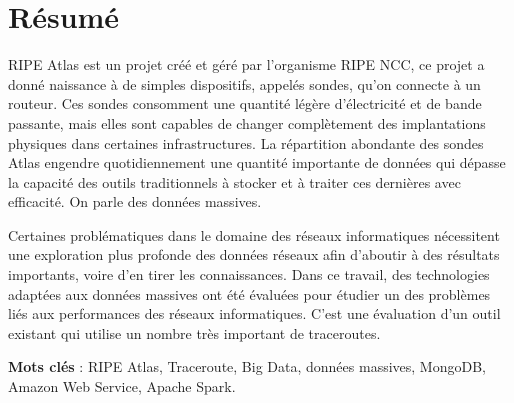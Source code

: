 \chapter*{Résumé}


RIPE Atlas est un projet créé et géré par l'organisme RIPE NCC,  ce projet a donné naissance à de
simples dispositifs, appelés sondes, qu'on  connecte à un routeur. Ces sondes consomment une quantité
légère d'électricité et de bande passante, mais elles sont capables de changer complètement des
implantations physiques dans certaines infrastructures.
La répartition abondante des sondes Atlas engendre quotidiennement une quantité importante
de données qui dépasse la capacité des outils traditionnels à stocker et à traiter  ces dernières avec
efficacité. On parle des données massives. 

Certaines problématiques dans le domaine des réseaux
informatiques nécessitent une exploration plus profonde des données réseaux afin d'aboutir à des
résultats importants, voire d'en tirer les connaissances. Dans ce travail, des technologies adaptées aux données massives ont été évaluées pour étudier un des problèmes liés aux performances des réseaux informatiques. C'est une évaluation d'un outil existant qui utilise    un nombre très important de traceroutes. 







\textbf{Mots clés} : RIPE Atlas, Traceroute,  Big Data, données massives, MongoDB, Amazon Web Service, Apache Spark.